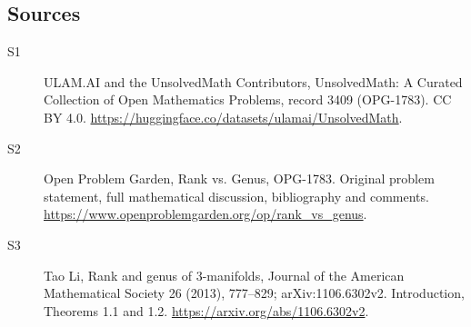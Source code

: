 \documentclass[11pt]{article}
\begin{document}
\subsection{Sources}
\begin{description}
\item[\hypertarget{source:3409:1}{S1}] ULAM.AI and the UnsolvedMath Contributors, UnsolvedMath: A Curated Collection of Open Mathematics Problems, record 3409 (OPG-1783). CC BY 4.0. \url{https://huggingface.co/datasets/ulamai/UnsolvedMath}.
\item[\hypertarget{source:3409:2}{S2}] Open Problem Garden, Rank vs. Genus, OPG-1783. Original problem statement, full mathematical discussion, bibliography and comments. \url{https://www.openproblemgarden.org/op/rank_vs_genus}.
\item[\hypertarget{source:3409:3}{S3}] Tao Li, Rank and genus of 3-manifolds, Journal of the American Mathematical Society 26 (2013), 777--829; arXiv:1106.6302v2. Introduction, Theorems 1.1 and 1.2. \url{https://arxiv.org/abs/1106.6302v2}.
\end{description}
\label{end:3409}
\end{document}
